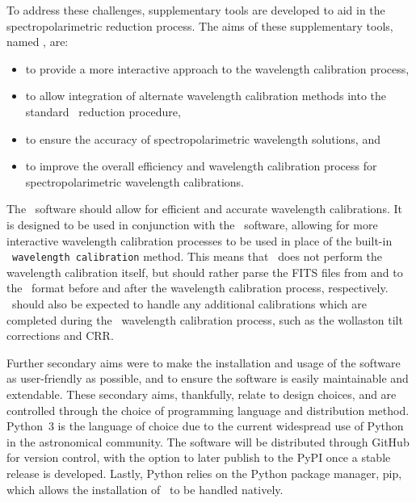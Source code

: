 To address these challenges, supplementary tools are developed to aid in the spectro\-polarimetric reduction process.
The aims of these supplementary tools, named \stops, are:
\begin{itemize}
    \item to provide a more interactive approach to the wavelength calibration process,
    \item to allow integration of alternate wavelength calibration methods into the standard \polsalt\ reduction procedure,
    \item to ensure the accuracy of spectropolarimetric wavelength solutions, and
    \item to improve the overall efficiency and wavelength calibration process for spectro\-polarimetric wavelength calibrations.
\end{itemize}
The \stops\ software should allow for efficient and accurate wavelength calibrations.
It is designed to be used in conjunction with the \polsalt\ software, allowing for more interactive wavelength calibration processes to be used in place of the built-in \polsalt\ \texttt{wavelength calibration} method.
This means that \stops\ does not perform the wavelength calibration itself, but should rather parse the \gls{FITS} files from and to the \polsalt\ format before and after the wavelength calibration process, respectively.
\stops\ should also be expected to handle any additional calibrations which are completed during the \polsalt\ wavelength calibration process, such as the wollaston tilt corrections and \gls{CRR}.

Further secondary aims were to make the installation and usage of the software as user-friendly as possible, and to ensure the software is easily maintainable and extendable.
These secondary aims, thankfully, relate to design choices, and are controlled through the choice of programming language and distribution method.
Python~$3$ is the language of choice due to the current widespread use of Python in the astronomical community.
The software will be distributed through GitHub for version control, with the option to later publish to the \gls{PyPI} once a stable release is developed.
Lastly, Python relies on the Python package manager, pip, which allows the installation of \stops\ to be handled natively.


